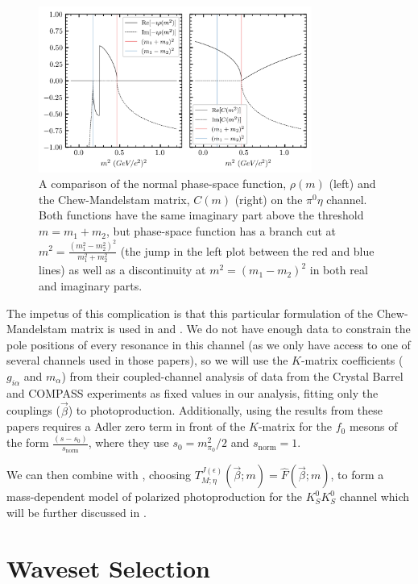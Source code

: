 \begin{figure}
  \begin{center}
    \includegraphics[width=0.8\textwidth]{figures/chew_mandelstam.png}
  \end{center}
  \caption{A comparison of the normal phase-space function, $\rho(m)$ (left) and the Chew-Mandelstam matrix, $C(m)$ (right) on the $\pi^0\eta$ channel. Both functions have the same imaginary part above the threshold $m = m_1 + m_2$, but phase-space function has a branch cut at $m^2 = \frac{(m_1^2 - m_2^2)^2}{m_1^2 + m_2^2}$ (the jump in the left plot between the red and blue lines) as well as a discontinuity at $m^2 = (m_1 - m_2)^2$ in both real and imaginary parts.}\label{fig:chew-mandelstam}
\end{figure}


The impetus of this complication is that this particular formulation of the Chew-Mandelstam matrix is used in \cite{albrecht_coupled_2020} and \cite{kopf_investigation_2021}. We do not have enough data to constrain the pole positions of every resonance in this channel (as we only have access to one of several channels used in those papers), so we will use the $K$-matrix coefficients ($g_{i\alpha}$ and $m_\alpha$) from their coupled-channel analysis of data from the Crystal Barrel and COMPASS experiments as fixed values in our analysis, fitting only the couplings ($\vec{\beta}$) to photoproduction. Additionally, using the results from these papers requires a Adler zero term in front of the $K$-matrix for the $f_0$ mesons of the form $\frac{(s - s_0)}{s_\text{norm}}$, where they use $s_0 = m^2_{\pi_0}/2$ and $s_\text{norm} = 1$.

We can then combine  with , choosing $T^{J(\epsilon)}_{M;\eta}(\vec{\beta}; m) = \hat{F}(\vec{\beta}; m)$, to form a mass-dependent model of polarized photoproduction for the $K_S^0K_S^0$ channel which will be further discussed in .

\section{Waveset Selection}
